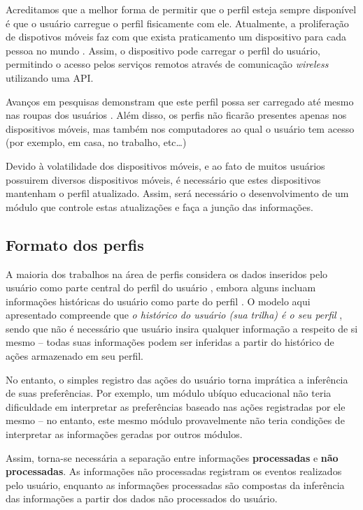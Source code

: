 \documentclass[a4paper, twocolumn]{article}
\begin{document}
Acreditamos que a melhor forma de permitir que o perfil esteja sempre disponível é que o usuário carregue o perfil fisicamente com ele. Atualmente, a proliferação de dispotivos móveis faz com que exista praticamento um dispositivo para cada pessoa no mundo \cite{bbc10}. Assim, o dispositivo pode carregar o perfil do usuário, permitindo o acesso pelos serviços remotos através de comunicação \emph{wireless} utilizando uma API.

Avanços em pesquisas demonstram que este perfil possa ser carregado até mesmo nas roupas dos usuários \cite{starner96}. Além disso, os perfis não ficarão presentes apenas nos dispositivos móveis, mas também nos computadores ao qual o usuário tem acesso (por exemplo, em casa, no trabalho, etc\ldots)

Devido à volatilidade dos dispositivos móveis, e ao fato de muitos usuários possuirem diversos dispositivos móveis, é necessário que estes dispositivos mantenham o perfil atualizado. Assim, será necessário o desenvolvimento de um módulo que controle estas atualizações e faça a junção das informações.


\subsection{Formato dos perfis} \label{sec:formato}

A maioria dos trabalhos na área de perfis considera os dados inseridos pelo usuário como parte central do perfil do usuário \cite{??}, embora alguns incluam informações históricas do usuário como parte do perfil \cite{??}. O modelo aqui apresentado compreende que \emph{o histórico do usuário (sua trilha) é o seu perfil} \cite{??}, sendo que não é necessário que usuário insira qualquer informação a respeito de si mesmo -- todas suas informações podem ser inferidas a partir do histórico de ações armazenado em seu perfil.

No entanto, o simples registro das ações do usuário torna imprática a inferência de suas preferências. Por exemplo, um módulo ubíquo educacional não teria dificuldade em interpretar as preferências baseado nas ações registradas por ele mesmo -- no entanto, este mesmo módulo provavelmente não teria condições de interpretar as informações geradas por outros módulos.

Assim, torna-se necessária a separação entre informações \textbf{processadas} e \textbf{não processadas}. As informações não processadas registram os eventos realizados pelo usuário, enquanto as informações processadas são compostas da inferência das informações a partir dos dados não processados do usuário.
\end{document}
